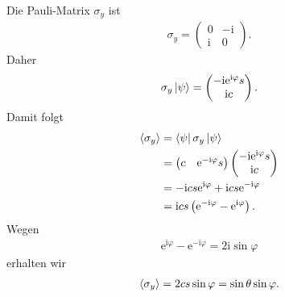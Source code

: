 \documentclass[11pt,a4paper]{scrartcl}
\newcommand{\e}{\mathrm e}
\newcommand{\ii}{\mathrm i}
\begin{document}
\begin{enumerate}[label=(\alph*)]
\begin{calculationbox}
            \begin{calculationbox}[title=Erwartungswert von $\sigma_y$]
                Die Pauli-Matrix $\sigma_y$ ist
                \begin{align*}
                    \sigma_y=
                    \begin{pmatrix}
                        0&-\ii\\
                        \ii&0
                    \end{pmatrix}.
                \end{align*}
                Daher
                \begin{align*}
                    \sigma_y\ket{\psi}
                    =
                    \begin{pmatrix}
                        -\ii\e^{\ii\varphi}s\\
                        \ii c
                    \end{pmatrix}.
                \end{align*}
                Damit folgt
                \begin{align*}
                    \braket{\sigma_y}
                    &=
                    \bra{\psi}\sigma_y\ket{\psi}\\
                    &=
                    \begin{pmatrix}
                        c & \e^{-\ii\varphi}s
                    \end{pmatrix}
                    \begin{pmatrix}
                        -\ii\e^{\ii\varphi}s\\
                        \ii c
                    \end{pmatrix}\\
                    &=
                    -\ii cs\e^{\ii\varphi}
                    +
                    \ii cs\e^{-\ii\varphi}\\
                    &=
                    \ii cs\left(\e^{-\ii\varphi}-\e^{\ii\varphi}\right).
                \end{align*}
                Wegen
                \begin{align*}
                    \e^{\ii\varphi}-\e^{-\ii\varphi}=2\ii\sin\varphi
                \end{align*}
                erhalten wir
                \begin{align*}
                    \braket{\sigma_y}
                    =
                    2cs\sin\varphi
                    =
                    \sin\theta\sin\varphi.
                \end{align*}
            \end{calculationbox}


\end{calculationbox}
\end{enumerate}
\end{document}
